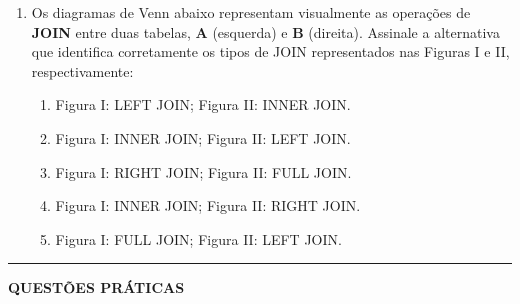 \documentclass[12pt,a4paper]{article}
\newcommand{\resposta}[1]{
\noindent
\framebox[\textwidth]{
\begin{minipage}{0.98\textwidth}
\vspace{#1}
\end{minipage}
}
}
\begin{document}
\begin{enumerate}
    \resposta{8cm}

    \item Os diagramas de Venn abaixo representam visualmente as operações de \textbf{JOIN} entre duas tabelas, \textbf{A} (esquerda) e \textbf{B} (direita). Assinale a alternativa que identifica corretamente os tipos de JOIN representados nas Figuras I e II, respectivamente:

    \begin{center}
        \hspace{2.5cm}
    \end{center}

    \begin{enumerate}[label=\Alph*)]
        \item Figura I: LEFT JOIN; Figura II: INNER JOIN.
        \item Figura I: INNER JOIN; Figura II: LEFT JOIN.
        \item Figura I: RIGHT JOIN; Figura II: FULL JOIN.
        \item Figura I: INNER JOIN; Figura II: RIGHT JOIN.
        \item Figura I: FULL JOIN; Figura II: LEFT JOIN.
    \end{enumerate}

\end{enumerate}
\vspace{0.5cm}
\newpage
\begin{center}
    \rule{\textwidth}{0.4pt}
    \textbf{QUESTÕES PRÁTICAS}
\end{center}
\end{document}
